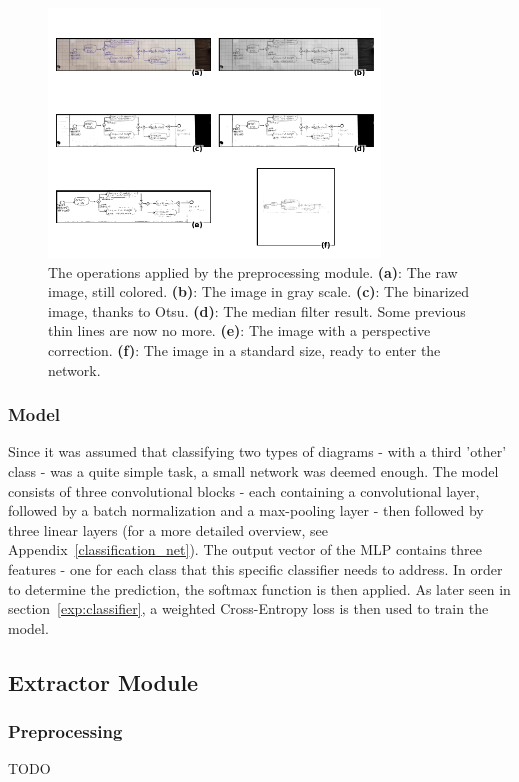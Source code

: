 \documentclass[conference]{IEEEtran}
\begin{document}
\begin{figure}[H]
	\centering
	\includegraphics[width=250pt]{classifier_preprocessing.png}
	\caption{
		The operations applied by the preprocessing module.
		\textbf{(a)}: The raw image, still colored.
		\textbf{(b)}: The image in gray scale.
		\textbf{(c)}: The binarized image, thanks to Otsu.
		\textbf{(d)}: The median filter result. Some previous thin lines are now no more.
		\textbf{(e)}: The image with a perspective correction.
		\textbf{(f)}: The image in a standard size, ready to enter the network.
	}
	\label{fig:classifier_preprocessing}
\end{figure} 

\subsubsection{Model}
Since it was assumed that classifying two types of diagrams - with a third 'other' class - was a quite simple task, a small network was deemed enough. The model consists of three convolutional blocks - each containing a convolutional layer, followed by a batch normalization and a max-pooling layer - then followed by three linear layers (for a more detailed overview, see Appendix~\ref{classification_net}). The output vector of the MLP contains three features - one for each class that this specific classifier needs to address. In order to determine the prediction, the softmax function is then applied. As later seen in section~\ref{exp:classifier}, a weighted Cross-Entropy loss is then used to train the model.  \\

\subsection{Extractor Module}
\subsubsection{Preprocessing}
TODO\\
\end{document}
